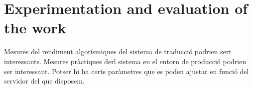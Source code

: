 \section{Experimentation and evaluation of the work}
Mesures del rendiment algorísmiques del sistema de traducció podrien sert interessants.
Mesures pràctiques derl sistema en el entorn de producció podrien ser interessant. Potser hi ha certs paràmetres que es poden ajustar en funció del servidor del que disposem.